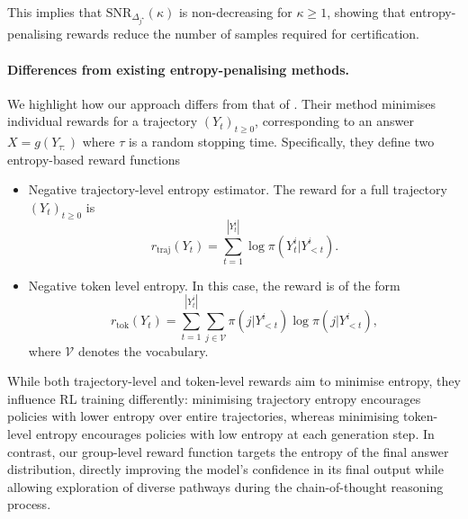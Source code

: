 This implies that $\text{SNR}_{\Delta_{j^\star}}(\kappa)$ is non-decreasing for $\kappa\geq1$, showing that entropy-penalising rewards reduce the number of samples required for certification. 



\paragraph{Differences from existing entropy-penalising methods.}
We highlight how our approach differs from that of \citep{agarwal2025unreasonableeffectivenessentropyminimization}.
Their method minimises individual rewards for a trajectory $(Y_t)_{t\geq 0}$, corresponding to an answer $X = g(Y_{\tau:})$ where $\tau$ is a random stopping time. Specifically, they define two entropy-based reward functions
\begin{itemize}
    \item Negative trajectory-level entropy estimator. The reward for a full trajectory $(Y_t)_{t\geq 0}$ is
    $$
    {r}_{\text{traj}}(Y_t)=\sum_{t=1}^{|Y^i_t|}\log\pi(Y_t^i|Y_{<t}^i).
    $$
    \item  Negative token level entropy. In this case, the reward is of the form
    $$
    r_{\text{tok}}(Y_t) =\sum_{t=1}^{|Y^i_t|}\sum_{j\in\mathcal{V}}\pi(j|Y_{<t}^i)\log\pi(j|Y_{<t}^i),
    $$
    where $\mathcal{V}$ denotes the vocabulary.
\end{itemize}
While both trajectory-level and token-level rewards aim to minimise entropy, they influence RL training differently: minimising trajectory entropy encourages policies with lower entropy over entire trajectories, whereas minimising token-level entropy encourages policies with low entropy at each generation step. 
In contrast, our group-level reward function targets the entropy of the final answer distribution, directly improving the model’s confidence in its final output while allowing exploration of diverse pathways during the chain-of-thought reasoning process.

